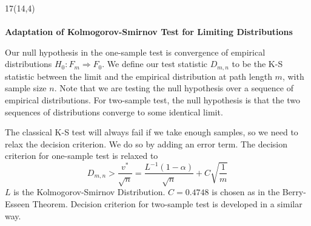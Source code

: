 \documentclass[a0]{a0poster}
\begin{document}







\begin{textblock}{17}(14,4)
\medskip
{}\\  %
\\ 
\textbf{Adaptation of Kolmogorov-Smirnov Test for Limiting Distributions}


Our null hypothesis in the one-sample test is convergence of empirical distributions
$H_0: F_m \Rightarrow F_0 $.
We define our test statistic $D_{m,n}$ to be the K-S statistic between the limit and the empirical distribution at path length $m$, with sample size $n$. 
Note that we are testing the null hypothesis over a sequence of empirical distributions. 
For two-sample test, the null hypothesis is that the two sequences of distributions converge to some identical limit.

The classical K-S test will always fail if we take enough samples, so we need to relax the decision criterion.
We do so by adding an error term. The decision criterion for one-sample test is relaxed to
\begin{equation}
  D_{m, n} > \frac{v^*}{\sqrt{n} } = \frac{L^{-1} (1 - \alpha)}{\sqrt{n} } + C \sqrt{\frac{1}{m}}
\end{equation}
$L$ is the Kolmogorov-Smirnov Distribution. $C = 0.4748$ is chosen as in the Berry-Esseen Theorem. Decision criterion for two-sample test is developed in a similar way.

\end{textblock}
\end{document}
